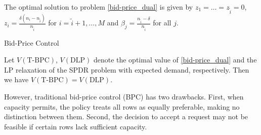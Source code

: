 \begin{lem}\label{bid-price}
The optimal solution to problem \eqref{bid-price_dual} is given by $z_1 = \ldots = z_{\tilde{i}} =0$, $z_{i} = \frac{\delta(n_i-n_{\tilde{i}})}{n_{\tilde{i}}}$ for $i = \tilde{i}+1, \ldots, M$ and $\beta_j = \frac{n_{\tilde{i}} - \delta}{n_{\tilde{i}}}$ for all $j$.
\end{lem}


\begin{algorithm}[H]
    \caption{Bid-Price Control}\label{algo_bid}
\end{algorithm}







Let $V(\text{T-BPC})$, $V(\text{DLP})$ denote the optimal value of \eqref{bid-price_dual} and the LP relaxation of the \textup{SPDR} problem with expected demand, respectively. Then we have $V(\text{T-BPC}) = V(\text{DLP})$.

However, traditional bid-price control (BPC) has two drawbacks. First, when capacity permits, the policy treats all rows as equally preferable, making no distinction between them. Second, the decision to accept a request may not be feasible if certain rows lack sufficient capacity.

